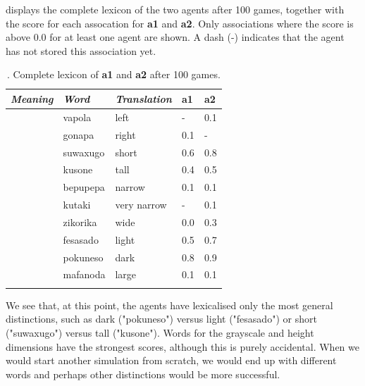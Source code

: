  displays the complete lexicon of the two agents after 100 games, 
together with the score for each assocation for 
{\bf a1} and {\bf a2}. Only associations where the 
score is above 0.0 for at least one agent are shown. 
A dash (-) indicates that the agent has not stored 
this association yet. 
\begin{table}
\begin{center}
\begin{tabular}{ l  l  l  l  l }
\lsptoprule
{\it Meaning}&{\it Word}&{\it Translation} & {\bf a1}&{\bf a2} \\ \midrule
[HPOS 0.0-0.5] & vapola&left&-&0.1\\ \midrule
[HPOS 0.5-1.0]& gonapa&right &0.1&-\\ \midrule
[HEIGHT 0.0-0.5]&suwaxugo&short &0.6&0.8\\ \midrule
[HEIGHT 0.5-1.0]& kusone&tall &0.4&0.5\\ \midrule
[WIDTH 0.0-0.5]&bepupepa&narrow &0.1&0.1\\ \midrule
[WIDTH 0.0-0.25]&kutaki&very narrow &-&0.1\\ \midrule
[WIDTH 0.5-1.0]& zikorika&wide &0.0&0.3\\ \midrule
[GRAY 0.0-0.5]& fesasado&light &0.5&0.7\\ \midrule
[GRAY 0.5-1.0]& pokuneso&dark &0.8&0.9\\ \midrule
[AREA 0.5-1.0]& mafanoda&large &0.1&0.1\\ \midrule
\lspbottomrule
\end{tabular}
\caption{\label{tab:lex100}. Complete lexicon of {\bf a1} and {\bf a2} after 100 games.}
\end{center}
\end{table}
We see that, at this point, the agents have lexicalised 
only the most general distinctions, such as dark ("pokuneso") 
versus light ("fesasado") or short ("suwaxugo") versus tall 
("kusone"). Words for the grayscale and height dimensions
have the strongest scores, although this is purely accidental. 
When we would start another simulation from scratch,
we would end up with different words and perhaps 
other distinctions would be more successful. 

